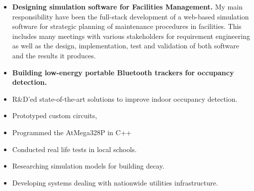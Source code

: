 \begin{itemize}
\item \textbf{Designing simulation software for Facilities Management.}
My main responsibility have been the full-stack development of a web-based simulation software for strategic planning of maintenance procedures in facilities.
This includes many meetings with various stakeholders for requirement engineering as well as the design, implementation, test and validation of both software and the results it produces.
\end{itemize}

\divider

\begin{itemize}
	\item \textbf{Building low-energy portable Bluetooth trackers for occupancy detection.}
	\item R\&D'ed state-of-the-art solutions to improve indoor occupancy detection.
	\item Prototyped custom circuits, 
	\item Programmed the AtMega328P in C++
	\item Conducted real life tests in local schools.  
\end{itemize}

\divider



\begin{itemize}
	\item Researching simulation models for building decay. 
\end{itemize}

\divider


\begin{itemize}
	\item Developing systems dealing with nationwide utilities infrastructure. 
\end{itemize}

\divider

